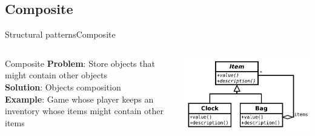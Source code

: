 \documentclass[10pt,compress]{beamer} %
\begin{document}
\subsection[Composite]{Composite}
\begin{frame}{Structural patterns}{Composite}
    \begin{columns}
	   \begin{block}{Composite}
			\textbf{Problem}: Store objects that might contain other objects\\
			\textbf{Solution}: Objects composition\\
			\textbf{Example}: Game whose player keeps an inventory whose items might contain other items\\
		\end{block}
			\centering\includegraphics[width=\linewidth]{figs/composite}
	\end{columns}
\end{frame}
\end{document}
